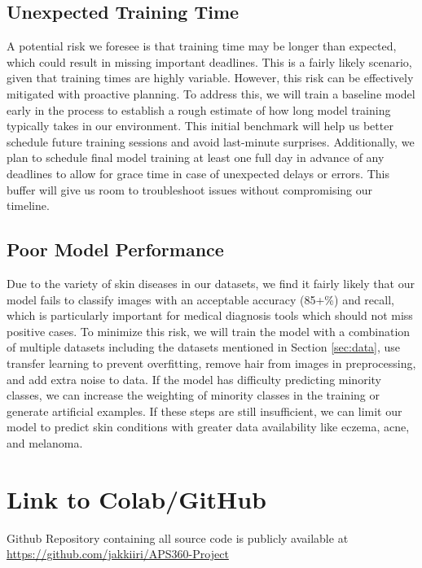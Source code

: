 \documentclass{article} %
\begin{document}
\subsection{Unexpected Training Time}

A potential risk we foresee is that training time may be longer than expected, which could result in missing important deadlines. This is a fairly likely scenario, given that training times are highly variable. However, this risk can be effectively mitigated with proactive planning. To address this, we will train a baseline model early in the process to establish a rough estimate of how long model training typically takes in our environment. This initial benchmark will help us better schedule future training sessions and avoid last-minute surprises. Additionally, we plan to schedule final model training at least one full day in advance of any deadlines to allow for grace time in case of unexpected delays or errors. This buffer will give us room to troubleshoot issues without compromising our timeline.

\subsection{Poor Model Performance}

Due to the variety of skin diseases in our datasets, we find it fairly likely that our model fails to classify images with an acceptable accuracy (85+\%) and recall, which is particularly important for medical diagnosis tools which should not miss positive cases. To minimize this risk, we will train the model with a combination of multiple datasets including the datasets mentioned in Section \ref{sec:data}, use transfer learning to prevent overfitting, remove hair from images in preprocessing, and add extra noise to data. If the model has difficulty predicting minority classes, we can increase the weighting of minority classes in the training or generate artificial examples. If these steps are still insufficient, we can limit our model to predict skin conditions with greater data availability like eczema, acne, and melanoma.

\section{Link to Colab/GitHub}

Github Repository containing all source code is publicly available at \url{https://github.com/jakkiiri/APS360-Project}

\label{last_page}

\clearpage


\end{document}
